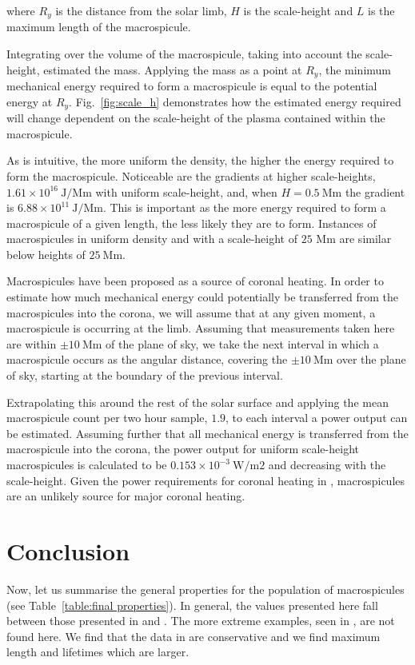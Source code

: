 \noindent where $R_y$ is the distance from the solar limb, $H$ is the scale-height and $L$ is the maximum length of the macrospicule.

Integrating over the volume of the macrospicule, taking into account the scale-height, estimated the mass. Applying the mass as a point at $R_y$, the minimum mechanical energy required to form a macrospicule is equal to the potential energy at $R_y$. Fig.~\ref{fig:scale_h} demonstrates how the estimated energy required will change dependent on the scale-height of the plasma contained within the macrospicule.

As is intuitive, the more uniform the density, the higher the energy required to form the macrospicule. Noticeable are the gradients at higher scale-heights, $1.61 \times 10^{16}\ \textrm{J/Mm}$ with uniform scale-height, and, when $H = 0.5\ \textrm{Mm}$ the gradient is  $6.88 \times 10^{11}\ \textrm{J/Mm}$. This is important as the more energy required to form a macrospicule of a given length, the less likely they are to form. Instances of macrospicules in uniform density and with a scale-height of $25$ Mm are similar below heights of $25\ \textrm{Mm}$.

Macrospicules have been proposed as a source of coronal heating. In order to estimate how much mechanical energy could potentially be transferred from the macrospicules into the corona, we will assume that at any given moment, a macrospicule is occurring at the limb. Assuming that measurements taken here are within $\pm10\ \textrm{Mm}$ of the plane of sky, we take the next interval in which a macrospicule occurs as the angular distance, covering the $\pm10\ \textrm{Mm}$ over the plane of sky, starting at the boundary of the previous interval. 

Extrapolating this around the rest of the solar surface and applying the mean macrospicule count per two hour sample, $1.9$, to each interval a power output can be estimated. Assuming further that all mechanical energy is transferred from the macrospicule into the corona, the power output for uniform scale-height macrospicules is calculated to be $0.153 \times 10^{-3}\ \textrm{W/m{2}}$ and decreasing with the scale-height. Given the power requirements for coronal heating in \citealt{AschwandenCHR2007}, macrospicules are an unlikely source for major coronal heating.


\section{Conclusion}
Now, let us summarise the general properties for the population of macrospicules (see Table~\ref{table:final properties}). In general, the values presented here fall between those presented in \citealt{Bohlin1975} and \citealt{Dere89}. The more extreme examples, seen in \citealt{Bohlin1975}, are not found here. We find that the data in \citealt{Dere89} are conservative and we find maximum length and lifetimes which are larger. 

